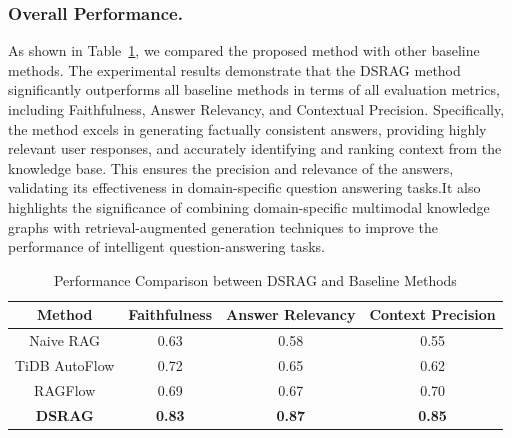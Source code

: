 \documentclass[runningheads]{llncs}
\begin{document}
    \subsubsection{Overall Performance.}As shown in Table~\ref{tab:performance_comparison}, we compared the proposed method with other baseline methods. The experimental results demonstrate that the DSRAG method significantly outperforms all baseline methods in terms of all evaluation metrics, including Faithfulness, Answer Relevancy, and Contextual Precision. Specifically, the method excels in generating factually consistent answers, providing highly relevant user responses, and accurately identifying and ranking context from the knowledge base. This ensures the precision and relevance of the answers, validating its effectiveness in domain-specific question answering tasks.It also highlights the significance of combining domain-specific multimodal knowledge graphs with retrieval-augmented generation techniques to improve the performance of intelligent question-answering tasks.

\begin{table}[H]
    \centering
    \small %
    \caption{Performance Comparison between DSRAG and Baseline Methods}
    \label{tab:performance_comparison}
    \setlength{\tabcolsep}{5pt} %
    \renewcommand{\arraystretch}{1.2}
    \begin{tabular}{|c|c|c|c|}
        \hline
        Method  %
        & Faithfulness  %
        & Answer Relevancy  %
        & Context Precision \\
        \hline
        Naive RAG        & 0.63 & 0.58 & 0.55 \\
        \hline
        TiDB AutoFlow    & 0.72 & 0.65 & 0.62 \\
        \hline
        RAGFlow          & 0.69 & 0.67 & 0.70 \\
        \hline
        \textbf{DSRAG}   & \textbf{0.83} & \textbf{0.87} & \textbf{0.85} \\
        \hline
    \end{tabular}
\end{table}
\end{document}

